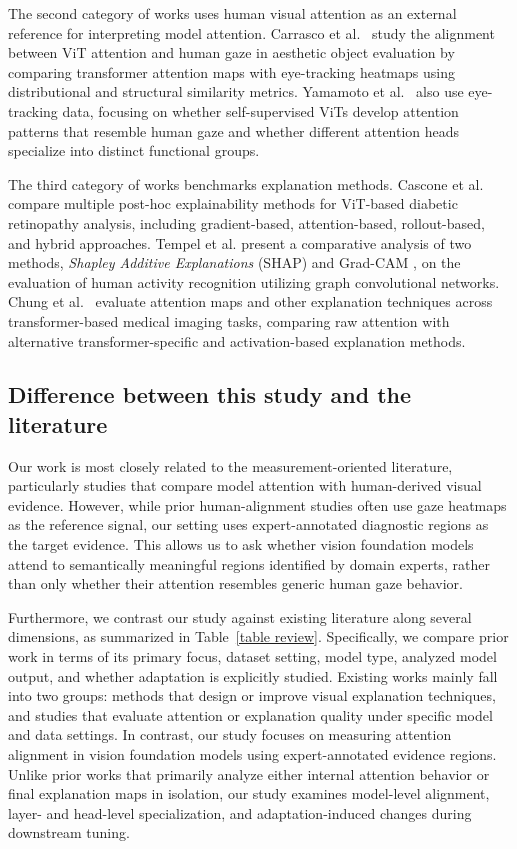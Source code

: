 \documentclass[lineno,pdflatex,sn-mathphys-num]{sn-jnl}%
\theoremstyle{thmstyleone}%
\theoremstyle{thmstyletwo}%
\theoremstyle{thmstylethree}%
\begin{document}
The second category of works uses human visual attention as an external reference for interpreting model attention. Carrasco et al.~\cite{Carrasco2026} study the alignment between ViT attention and human gaze in aesthetic object evaluation by comparing transformer attention maps with eye-tracking heatmaps using distributional and structural similarity metrics. Yamamoto et al.~\cite{Yamamoto2025} also use eye-tracking data, focusing on whether self-supervised ViTs develop attention patterns that resemble human gaze and whether different attention heads specialize into distinct functional groups. 

The third category of works benchmarks explanation methods. Cascone et al.~\cite{Cascone2026947} compare multiple post-hoc explainability methods for ViT-based diabetic retinopathy analysis, including gradient-based, attention-based, rollout-based, and hybrid approaches. Tempel et al. \cite{Tempel2025} present a comparative analysis of two methods, \textit{Shapley Additive Explanations} (SHAP) \cite{Lundberg17SHAP} and Grad-CAM \cite{Selvaraju17GradCAM}, on the evaluation of human activity recognition utilizing graph convolutional networks. Chung et al.~\cite{Chung2025110} evaluate attention maps and other explanation techniques across transformer-based medical imaging tasks, comparing raw attention with alternative transformer-specific and activation-based explanation methods.

\subsection{Difference between this study and the literature}

Our work is most closely related to the measurement-oriented literature, particularly studies that compare model attention with human-derived visual evidence. However, while prior human-alignment studies often use gaze heatmaps as the reference signal, our setting uses expert-annotated diagnostic regions as the target evidence. This allows us to ask whether vision foundation models attend to semantically meaningful regions identified by domain experts, rather than only whether their attention resembles generic human gaze behavior.

Furthermore, we contrast our study against existing literature along several dimensions, as summarized in Table~\ref{table review}. Specifically, we compare prior work in terms of its primary focus, dataset setting, model type, analyzed model output, and whether adaptation is explicitly studied. Existing works mainly fall into two groups: methods that design or improve visual explanation techniques, and studies that evaluate attention or explanation quality under specific model and data settings. In contrast, our study focuses on measuring attention alignment in vision foundation models using expert-annotated evidence regions. Unlike prior works that primarily analyze either internal attention behavior or final explanation maps in isolation, our study examines model-level alignment, layer- and head-level specialization, and adaptation-induced changes during downstream tuning.
\end{document}
